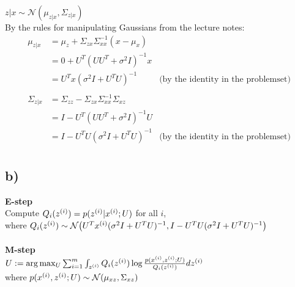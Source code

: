 \documentclass[11pt]{article}
\begin{document}
$z|x \sim \mathcal{N}(\mu_{z|x},\Sigma_{z|x})$\\

By the rules for manipulating Gaussians from the lecture notes:
\begin{align*}
    \mu_{z|x} &= \mu_z + \Sigma_{zx} \Sigma_{xx}^{-1} (x - \mu_x) \\
              &= 0 + U^T(UU^T + \sigma^2 I)^{-1} x \\
              &= U^T x (\sigma^2 I + U^T U)^{-1} &\text{(by the identity in the problemset)} \\
              \\
 \Sigma_{z|x} &= \Sigma_{zz} - \Sigma_{zx} \Sigma_{xx}^{-1} \Sigma_{xz} \\
              &= I - U^T (UU^T + \sigma^2 I)^{-1} U \\
              &= I - U^T U (\sigma^2 I + U^T U)^{-1} &\text{(by the identity in the problemset)} \\
\end{align*}

\subsection*{b)}

\textbf{E-step}\\
Compute $Q_i(z^{(i)}) = p(z^{(i)}|x^{(i)}; U)$ for all $i$,\\
where $Q_i(z^{(i)}) \sim \mathcal{N}\big(U^T x^{(i)} (\sigma^2 I + U^T U)^{-1}, I - U^T U (\sigma^2 I + U^T U)^{-1}\big)$
\\\\ 
\textbf{M-step}\\
$U := \arg \max_U \sum_{i=1}^m \int_{z^{(i)}} Q_i(z^{(i)}) \log \frac{p(x^{(i)},z^{(i)}; U)}{Q_i(z^{(i)})} d z^{(i)}$\\

where $p(x^{(i)},z^{(i)};U) \sim \mathcal{N}(\mu_{xz},\Sigma_{xz})$\\
\end{document}
